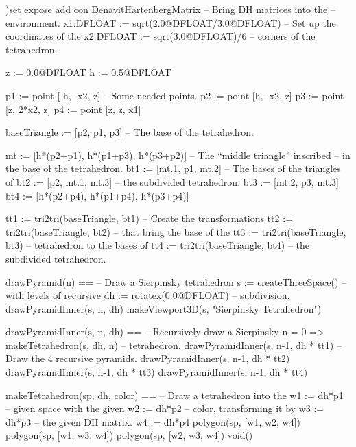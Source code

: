 \begin{xmpLinesPlain}
)set expose add con DenavitHartenbergMatrix              -- Bring DH matrices into the
                                                         -- \quad{}environment.
x1:DFLOAT := sqrt(2.0@DFLOAT/3.0@DFLOAT)                 -- Set up the coordinates of the
x2:DFLOAT := sqrt(3.0@DFLOAT)/6                          -- \quad{}corners of the tetrahedron.

z := 0.0@DFLOAT
h := 0.5@DFLOAT

p1 := point [-h, -x2, z]                                 -- Some needed points.
p2 := point [h, -x2, z]
p3 := point [z, 2*x2, z]
p4 := point [z, z, x1]

baseTriangle  := [p2, p1, p3]                            -- The base of the tetrahedron.

mt := [h*(p2+p1), h*(p1+p3), h*(p3+p2)]                  -- The ``middle triangle'' inscribed
                                                         -- \quad{}in the base of the tetrahedron.
bt1 := [mt.1, p1, mt.2]                                  -- The bases of the triangles of
bt2 := [p2, mt.1, mt.3]                                  -- \quad{}the subdivided tetrahedron.
bt3 := [mt.2, p3, mt.3]
bt4 := [h*(p2+p4), h*(p1+p4), h*(p3+p4)]

tt1 := tri2tri(baseTriangle, bt1)                        -- Create the transformations
tt2 := tri2tri(baseTriangle, bt2)                        -- \quad{}that bring the base of the
tt3 := tri2tri(baseTriangle, bt3)                        -- \quad{}tetrahedron to the bases of
tt4 := tri2tri(baseTriangle, bt4)                        -- \quad{}the subdivided tetrahedron.

drawPyramid(n) ==                                        -- Draw a Sierpinsky tetrahedron
  s := createThreeSpace()                                -- \quad{}with  levels of recursive
  dh := rotatex(0.0@DFLOAT)                              -- \quad{}subdivision.
  drawPyramidInner(s, n, dh)
  makeViewport3D(s, "Sierpinsky Tetrahedron")

drawPyramidInner(s, n, dh) ==                            -- Recursively draw a Sierpinsky
  n = 0 => makeTetrahedron(s, dh, n)                     -- \quad{}tetrahedron.
  drawPyramidInner(s, n-1, dh * tt1)                     -- Draw the 4 recursive pyramids.
  drawPyramidInner(s, n-1, dh * tt2)
  drawPyramidInner(s, n-1, dh * tt3)
  drawPyramidInner(s, n-1, dh * tt4)

makeTetrahedron(sp, dh, color) ==                        -- Draw a tetrahedron into the
  w1 := dh*p1                                            -- \quad{}given space with the given
  w2 := dh*p2                                            -- \quad{}color, transforming it by
  w3 := dh*p3                                            -- \quad{}the given DH matrix.
  w4 := dh*p4
  polygon(sp, [w1, w2, w4])
  polygon(sp, [w1, w3, w4])
  polygon(sp, [w2, w3, w4])
  void()
\end{xmpLinesPlain}


